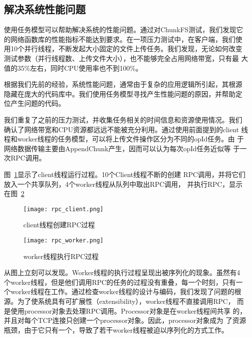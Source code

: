 \subsection{解决系统性能问题}

使用任务模型可以帮助解决系统的性能问题。通过对ChunkFS测试，我们发现它
的网络函数库的性能指标不能达到要求。在一项压力测试中，在客户端，我们使
用10个并行线程，不断发起大小固定的文件上传任务。我们发现，无论如何改变
测试参数（并行线程数、上传文件大小），也不能够完全占用网络带宽，只有最
大值的35\%左右，同时CPU使用率也不到100\%。

根据我们先前的经验，系统性能问题，通常由于复杂的应用逻辑所引起，其根源
隐藏在庞大的代码库中。我们使用任务模型寻找产生性能问题的原因，并帮助定
位产生问题的代码。

我们重复了之前的压力测试，并收集任务相关的时间信息和资源使用情况。我们
确认了网络带宽和CPU资源都远远不能被充分利用。通过使用前面提到的client
线程和worker线程的任务模型，可以将上传文件操作区分为不同的opId任务。由
于网络数据传输主要由Append\-Chunk产生，因而可以认为每次opId任务近似等
于一次RPC调用。


图~\ref{fig:rpc_client}显示了client线程运行过程。10个Client线程不断的创建
RPC调用，并将它们放入一个共享队列，4个worker线程从队列中取出RPC调用，
并执行RPC，显示在图~\ref{fig:rpc_worker}
 
\begin{figure}
  \centering
  \begin{minipage}{0.8\linewidth}
    \centering
    \texttt{[image: rpc\_client.png]}
    \caption{client线程创建RPC过程}
    \label{fig:rpc_client}
  \end{minipage}
\end{figure}

\begin{figure}
  \centering
  \begin{minipage}{0.8\linewidth}
    \centering
    \texttt{[image: rpc\_worker.png]}
    \caption{worker线程执行RPC过程}
    \label{fig:rpc_worker}
  \end{minipage}
\end{figure}

从图上立刻可以发现。Worker线程的执行过程呈现出被序列化的现象。虽然有4
个worker线程，但是他们调用RPC的任务的过程没有重叠，每一个时刻，只有一
个worker线程在工作。通过检查worker线程的设计与编码，我们发现了问题的根
源。为了使系统具有可扩展性（extensibility），worker线程不直接调用RPC，
而是使用processor对象去处理RPC调用。Processor对象是在worker线程间共享
的，并且对每个TCP连接只创建一个processor对象。因此，processor对象成为
了资源瓶颈，由于它只有一个，导致了若干worker线程被迫以序列化的方式工作。

